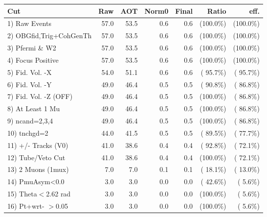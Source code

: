  \begin{table}[h!]\centering
 \begin{tabular}{||l||r|r|r|r|r|r||}
 \hline
 \hline
 Cut & Raw & AOT & Norm0 & Final & Ratio & eff.       \\
 \hline
  1) Raw Events           &         57.0 &         53.5 &          0.6 &          0.6 & (100.0\%) & (100.0\%) \\
  2) OBGfid,Trig+CohGenTh &         57.0 &         53.5 &          0.6 &          0.6 & (100.0\%) & (100.0\%) \\
  3) Pfermi \& W2         &         57.0 &         53.5 &          0.6 &          0.6 & (100.0\%) & (100.0\%) \\
  4) Focus Positive       &         57.0 &         53.5 &          0.6 &          0.6 & (100.0\%) & (100.0\%) \\
  5) Fid. Vol. -X         &         54.0 &         51.1 &          0.6 &          0.6 & ( 95.7\%) & ( 95.7\%) \\
  6) Fid. Vol. -Y         &         49.0 &         46.4 &          0.5 &          0.5 & ( 90.8\%) & ( 86.8\%) \\
  7) Fid. Vol. -Z (OFF)   &         49.0 &         46.4 &          0.5 &          0.5 & (100.0\%) & ( 86.8\%) \\
  8) At Least 1 Mu        &         49.0 &         46.4 &          0.5 &          0.5 & (100.0\%) & ( 86.8\%) \\
  9) ncand=2,3,4          &         49.0 &         46.4 &          0.5 &          0.5 & (100.0\%) & ( 86.8\%) \\
 10) tnchgd=2             &         44.0 &         41.5 &          0.5 &          0.5 & ( 89.5\%) & ( 77.7\%) \\
 11) +/- Tracks (V0)      &         41.0 &         38.6 &          0.4 &          0.4 & ( 92.8\%) & ( 72.1\%) \\
 12) Tube/Veto Cut        &         41.0 &         38.6 &          0.4 &          0.4 & (100.0\%) & ( 72.1\%) \\
 13) 2 Muons (1mux)       &          7.0 &          7.0 &          0.1 &          0.1 & ( 18.1\%) & ( 13.0\%) \\
 14) PmuAsym<0.0          &          3.0 &          3.0 &          0.0 &          0.0 & ( 42.6\%) & (  5.6\%) \\
 15) Theta$<$2.62 rad     &          3.0 &          3.0 &          0.0 &          0.0 & (100.0\%) & (  5.6\%) \\
 16) Pt+wrt- $>$0.05      &          3.0 &          3.0 &          0.0 &          0.0 & (100.0\%) & (  5.6\%) \\

\end{tabular}
\end{table}
